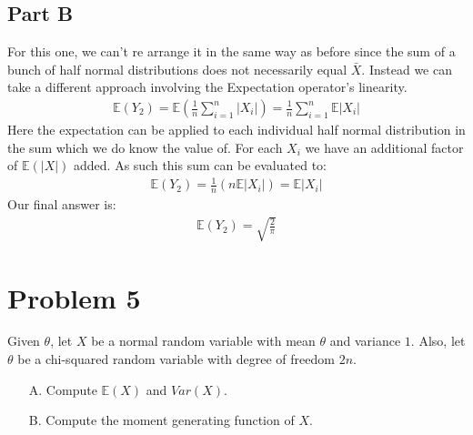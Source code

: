 \documentclass{article}
\begin{document}
\subsection*{Part B}
For this one, we can't re arrange it in the same way as before since the sum of a bunch of half normal distributions does not necessarily equal $\bar{X}$. Instead we can take a different approach involving the Expectation operator's linearity.
\begin{align*}
\mathbb{E}(Y_2) = \mathbb{E}(\frac{1}{n}\sum_{i=1}^{n}|X_i|) = \frac{1}{n}\sum_{i=1}^{n}\mathbb{E}|X_i|
\end{align*}
Here the expectation can be applied to each individual half normal distribution in the sum which we do know the value of. For each $X_i$ we have an additional factor of $\mathbb{E}(|X|)$ added. As such this sum can be evaluated to:
\begin{align*}
\mathbb{E}(Y_2) = \frac{1}{n} (n \mathbb{E}|X_i|) = \mathbb{E}|X_i|
\end{align*}
Our final answer is:
\begin{align*}
\boxed{ \mathbb{E}(Y_2) = \sqrt{\frac{2}{\pi}}}
\end{align*}

\clearpage
\section*{Problem 5}
Given $\theta$, let $X$ be a normal random variable with mean $\theta$ and variance $1$. Also, let
$\theta$ be a chi-squared random variable with degree of freedom $2n$.
\begin{enumerate}
\item[A.] Compute $\mathbb{E}(X)$ and $Var(X)$.
\item[B.] Compute the moment generating function of $X$.
\end{enumerate}
\end{document}
